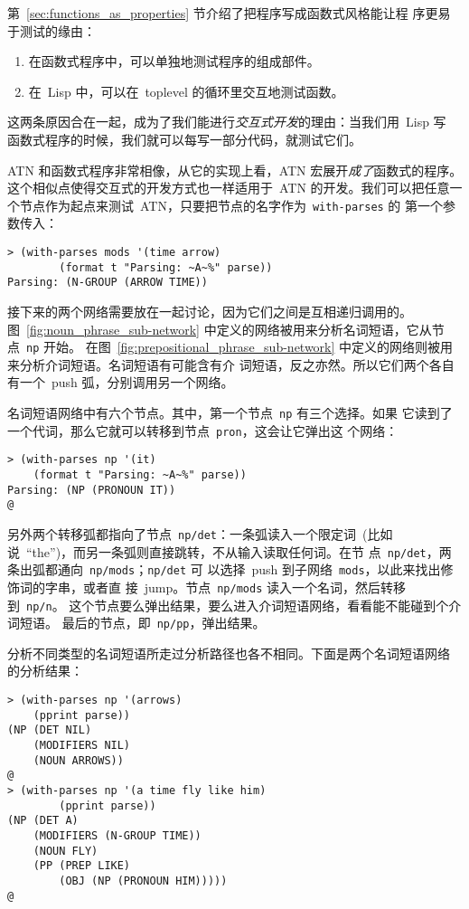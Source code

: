 第~\ref{sec:functions_as_properties} 节介绍了把程序写成函数式风格能让程
序更易于测试的缘由：
\begin{enumerate}
\item 在函数式程序中，可以单独地测试程序的组成部件。
\item 在~Lisp 中，可以在~toplevel 的循环里交互地测试函数。
\end{enumerate}

这两条原因合在一起，成为了我们能进行\emph{交互式开发}的理由：当我们用~Lisp 写
函数式程序的时候，我们就可以每写一部分代码，就测试它们。

\textsc{ATN} 和函数式程序非常相像，从它的实现上看，\textsc{ATN} 宏展开\emph{成了}函数式的程序。
这个相似点使得交互式的开发方式也一样适用于~\textsc{ATN} 的开发。我们可以把任意一
个节点作为起点来测试~\textsc{ATN}，只要把节点的名字作为~\texttt{with-parses} 的
第一个参数传入：

\begin{lstlisting}
> (with-parses mods '(time arrow)
        (format t "Parsing: ~A~%" parse))
Parsing: (N-GROUP (ARROW TIME))
\end{lstlisting}
接下来的两个网络需要放在一起讨论，因为它们之间是互相递归调用的。
图~\ref{fig:noun_phrase_sub-network} 中定义的网络被用来分析名词短语，它从节点~\texttt{np} 开始。
在图~\ref{fig:prepositional_phrase_sub-network} 中定义的网络则被用来分析介词短语。名词短语有可能含有介
词短语，反之亦然。所以它们两个各自有一个~push 弧，分别调用另一个网络。

名词短语网络中有六个节点。其中，第一个节点~\texttt{np} 有三个选择。如果
它读到了一个代词，那么它就可以转移到节点~\texttt{pron}，这会让它弹出这
个网络：
\begin{lstlisting}
> (with-parses np '(it)
    (format t "Parsing: ~A~%" parse))
Parsing: (NP (PRONOUN IT))
@
\end{lstlisting}

另外两个转移弧都指向了节点~\texttt{np/det}：一条弧读入一个限定词~(比如
说~``the'')，而另一条弧则直接跳转，不从输入读取任何词。在节
点~\texttt{np/det}，两条出弧都通向~\texttt{np/mods}；\texttt{np/det} 可
以选择~push 到子网络~\texttt{mods}，以此来找出修饰词的字串，或者直
接~jump。节点~\texttt{np/mods} 读入一个名词，然后转移到~\texttt{np/n}。
这个节点要么弹出结果，要么进入介词短语网络，看看能不能碰到个介词短语。
最后的节点，即~\texttt{np/pp}，弹出结果。

分析不同类型的名词短语所走过分析路径也各不相同。下面是两个名词短语网络
的分析结果：
\begin{lstlisting}
> (with-parses np '(arrows)
    (pprint parse))
(NP (DET NIL)
    (MODIFIERS NIL)
    (NOUN ARROWS))
@
> (with-parses np '(a time fly like him)
        (pprint parse))
(NP (DET A)
    (MODIFIERS (N-GROUP TIME))
    (NOUN FLY)
    (PP (PREP LIKE)
        (OBJ (NP (PRONOUN HIM)))))
@
\end{lstlisting}


